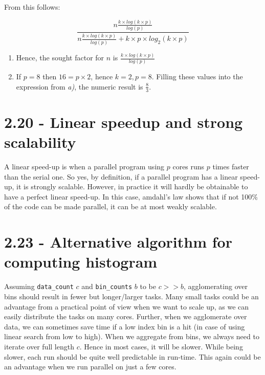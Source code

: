 \documentclass[a4paper,11pt,twoside]{article}
\begin{document}
From this follows:

\begin{equation*}
\frac{n\frac{k \times log(k\times p)}{log(p)}}{n \frac{k \times log(k \times p)}{log(p)} + k \times p \times log_{2}(k \times p)}
\end{equation*}


\begin{enumerate}[label={\alph*)}]
\item Hence, the sought factor for $n$ is $\frac{k \times log(k\times p)}{log(p)}$

\item If $p = 8$ then $16 = p \times 2$, hence $k = 2, p = 8$. Filling these values into the expression from \textit{a)}, the numeric result is $\frac{8}{3}$.
  
\end{enumerate}


\section{2.20 - Linear speedup and strong scalability}
A linear speed-up is when a parallel program using $p$ cores runs $p$ times faster than the serial one. So yes, by definition, if a parallel program has a linear speed-up, it is strongly scalable. However, in practice it will hardly be obtainable to have a perfect linear speed-up. In this case, amdahl's law shows that if not 100\% of the code can be made parallel, it can be at most weakly scalable.

\section{2.23 - Alternative algorithm for computing histogram}
Assuming \verb+data_count+ $c$ and \verb+bin_counts+ $b$ to be $c >> b$, agglomerating over bins should result in fewer but longer/larger tasks. Many small tasks could be an advantage from a practical point of view when we want to scale up, as we can easily distribute the tasks on many cores. Further, when we agglomerate over data, we can sometimes save time if a low index bin is a hit (in case of using linear search from low to high). When we aggregate from bins, we always need to iterate over full length $c$. Hence in most cases, it will be slower. While being slower, each run should be quite well predictable in run-time. This again could be an advantage when we run parallel on just a few cores. 


\end{document}
